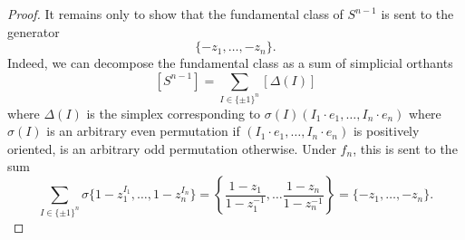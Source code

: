 \documentclass[10pt,a4paper]{amsart}
\begin{document}
\begin{proof}
        It remains only to show that the fundamental class of $S^{n-1}$ is sent to the generator
        \[
        \{-z_1,\ldots, -z_n\}.
        \]
        Indeed, we can decompose the fundamental class as a sum of simplicial orthants 
        \[
        [S^{n-1}]=\sum_{I\in \{\pm 1\}^n} [\Delta(I)]
        \]
        where $\Delta(I)$ is the simplex corresponding to $\sigma(I) (I_1\cdot e_1,\ldots, I_n\cdot e_n)$ where $\sigma(I)$ is an arbitrary even permutation if $(I_1\cdot e_1,\ldots, I_n\cdot e_n)$ is positively oriented, is an arbitrary odd permutation otherwise. Under $f_n$, this is sent to the sum
        \[
        \sum_{I\in \{\pm 1\}^n} \sigma \{ 1-z_1^{I_1},\ldots, 1-z_n^{I_n}\} = \left\{ \frac{1-z_1}{1-z_1^{-1}} ,\ldots \frac{1-z_n}{1-z_n^{-1}} \right\} = \{ -z_1,\ldots, -z_n\}.
        \]
    \end{proof}
\end{document}
